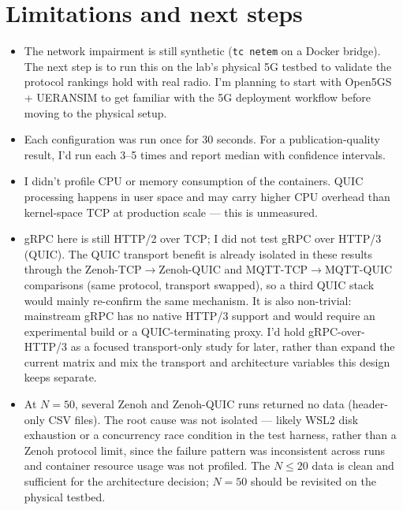 \documentclass[11pt,a4paper]{article}
\begin{document}
\section{Limitations and next steps}

\begin{itemize}
    \item The network impairment is still synthetic (\texttt{tc netem} on a Docker bridge). The next step is to run this on the lab's physical 5G testbed to validate the protocol rankings hold with real radio. I'm planning to start with Open5GS + UERANSIM to get familiar with the 5G deployment workflow before moving to the physical setup.

    \item Each configuration was run once for 30 seconds. For a publication-quality result, I'd run each 3--5 times and report median with confidence intervals.

    \item I didn't profile CPU or memory consumption of the containers. QUIC processing happens in user space and may carry higher CPU overhead than kernel-space TCP at production scale --- this is unmeasured.

    \item gRPC here is still HTTP/2 over TCP; I did not test gRPC over HTTP/3 (QUIC). The QUIC transport benefit is already isolated in these results through the Zenoh-TCP$\to$Zenoh-QUIC and MQTT-TCP$\to$MQTT-QUIC comparisons (same protocol, transport swapped), so a third QUIC stack would mainly re-confirm the same mechanism. It is also non-trivial: mainstream gRPC has no native HTTP/3 support and would require an experimental build or a QUIC-terminating proxy. I'd hold gRPC-over-HTTP/3 as a focused transport-only study for later, rather than expand the current matrix and mix the transport and architecture variables this design keeps separate.

    \item At $N=50$, several Zenoh and Zenoh-QUIC runs returned no data (header-only CSV files). The root cause was not isolated --- likely WSL2 disk exhaustion or a concurrency race condition in the test harness, rather than a Zenoh protocol limit, since the failure pattern was inconsistent across runs and container resource usage was not profiled. The $N \leq 20$ data is clean and sufficient for the architecture decision; $N=50$ should be revisited on the physical testbed.
\end{itemize}
\end{document}
